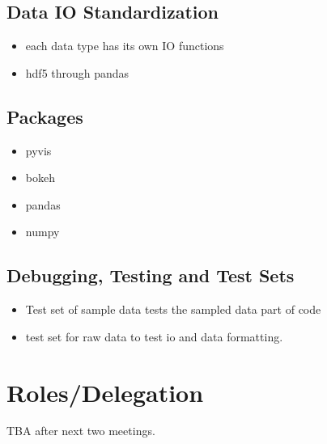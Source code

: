 \documentclass{article}
\begin{document}
\subsection{Data IO Standardization}
\begin{itemize}
  \item each data type has its own IO functions
  \item hdf5 through pandas
\end{itemize}


\subsection{Packages}
\begin{itemize}
  \item pyvis
  \item bokeh
  \item pandas
  \item numpy
\end{itemize}

\subsection{Debugging, Testing and Test Sets}
\begin{itemize}
  \item Test set of sample data tests the sampled data part of code
  \item test set for raw data to test io and data formatting.
\end{itemize}

\section{Roles/Delegation}
TBA after next two meetings.
\end{document}
